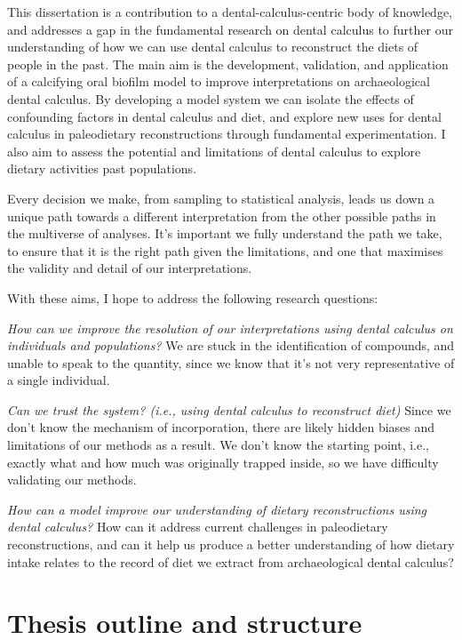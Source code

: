 \documentclass[
  letterpaper,
]{book}
\begin{document}
This dissertation is a contribution to a dental-calculus-centric body of
knowledge, and addresses a gap in the fundamental research on dental
calculus to further our understanding of how we can use dental calculus
to reconstruct the diets of people in the past. The main aim is the
development, validation, and application of a calcifying oral biofilm
model to improve interpretations on archaeological dental calculus. By
developing a model system we can isolate the effects of confounding
factors in dental calculus and diet, and explore new uses for dental
calculus in paleodietary reconstructions through fundamental
experimentation. I also aim to assess the potential and limitations of
dental calculus to explore dietary activities past populations.

Every decision we make, from sampling to statistical analysis, leads us
down a unique path towards a different interpretation from the other
possible paths in the multiverse of analyses. It's important we fully
understand the path we take, to ensure that it is the right path given
the limitations, and one that maximises the validity and detail of our
interpretations.

With these aims, I hope to address the following research questions:

\emph{How can we improve the resolution of our interpretations using
dental calculus on individuals and populations?} We are stuck in the
identification of compounds, and unable to speak to the quantity, since
we know that it's not very representative of a single individual.

\emph{Can we trust the system? (i.e., using dental calculus to
reconstruct diet)} Since we don't know the mechanism of incorporation,
there are likely hidden biases and limitations of our methods as a
result. We don't know the starting point, i.e., exactly what and how
much was originally trapped inside, so we have difficulty validating our
methods.

\emph{How can a model improve our understanding of dietary
reconstructions using dental calculus?} How can it address current
challenges in paleodietary reconstructions, and can it help us produce a
better understanding of how dietary intake relates to the record of diet
we extract from archaeological dental calculus?

\hypertarget{thesis-outline-and-structure}{%
\section{Thesis outline and
structure}\label{thesis-outline-and-structure}}
\end{document}
